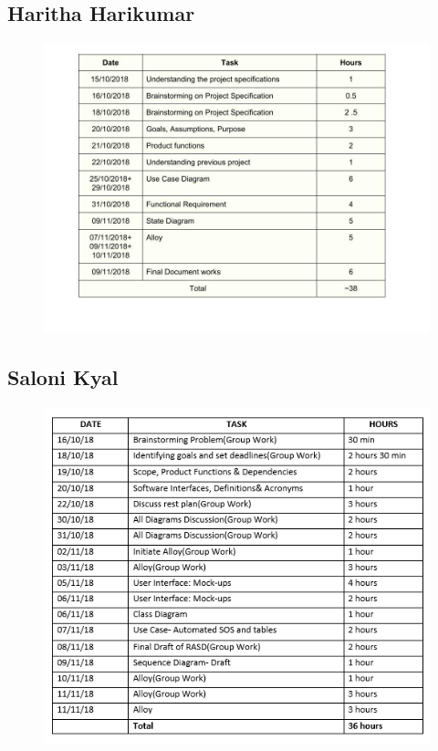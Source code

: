 \subsection{Haritha Harikumar}
\begin{figure}[H]
	\begin{center}
		\includegraphics[width=\textwidth]{./Diagrams/Effort_Haritha.jpg}
	\end{center}
\end{figure}
\subsection{Saloni Kyal}
\begin{figure}[H]
	\begin{center}
		\includegraphics[width=\textwidth]{./Diagrams/Effort_Saloni.PNG}
	\end{center}
\end{figure}
